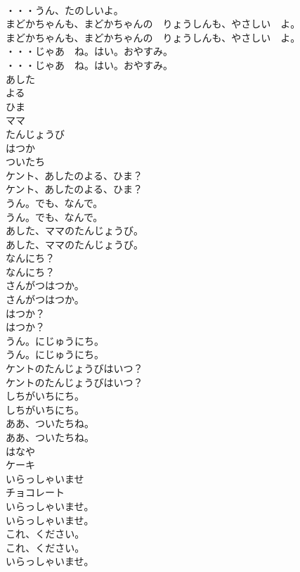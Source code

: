 \documentclass[8pt]{extreport}
\begin{document}
\begin{CJK}{UTF8}{min}
\\	・・・うん、たのしいよ。 
\\	まどかちゃんも、まどかちゃんの　りょうしんも、やさしい　よ。	
\\	まどかちゃんも、まどかちゃんの　りょうしんも、やさしい　よ。 
\\	・・・じゃあ　ね。はい。おやすみ。	
\\	・・・じゃあ　ね。はい。おやすみ。 
\\	あした
\\	よる
\\	ひま
\\	ママ
\\	たんじょうび
\\	はつか
\\	ついたち
\\	ケント、あしたのよる、ひま？	
\\	ケント、あしたのよる、ひま？ 
\\	うん。でも、なんで。	
\\	うん。でも、なんで。 
\\	あした、ママのたんじょうび。	
\\	あした、ママのたんじょうび。 
\\	なんにち？	
\\	なんにち？ 
\\	さんがつはつか。	
\\	さんがつはつか。 
\\	はつか？	
\\	はつか？ 
\\	うん。にじゅうにち。	
\\	うん。にじゅうにち。 
\\	ケントのたんじょうびはいつ？	
\\	ケントのたんじょうびはいつ？ 
\\	しちがいちにち。	
\\	しちがいちにち。 
\\	ああ、ついたちね。	
\\	ああ、ついたちね。 
\\	はなや
\\	ケーキ
\\	いらっしゃいませ
\\	チョコレート
\\	いらっしゃいませ。	
\\	いらっしゃいませ。 
\\	これ、ください。	
\\	これ、ください。 
\\	いらっしゃいませ。	

\end{CJK}
\end{document}
